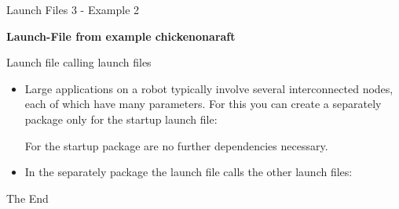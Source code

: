 \documentclass{beamer}
\begin{document}
\begin{frame}{Launch Files 3 - Example 2}
	\begin{large}
		\textbf{Launch-File from example chickenonaraft} 
	\end{large}
	\vspace{10px}

\end{frame}
\begin{frame}{Launch file calling launch files}
\begin{itemize}
\item Large applications on a robot typically involve several interconnected nodes, each of which have many parameters. For this you can create a separately package only for the startup launch file:
\vspace{10px}

\vspace{10px}
For the startup package are no further dependencies necessary. 
\end{itemize}
\begin{itemize}
 \item In the separately package the launch file calls the other launch files:
 
\end{itemize}
\end{frame}
\begin{frame}
\Huge{\centerline{The End}}
\end{frame}
\end{document}
